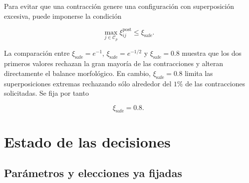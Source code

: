\documentclass[11pt,a4paper]{article}
\begin{document}
Para evitar que una contracción genere una configuración con
superposición excesiva, puede imponerse la condición

\begin{equation}
	\max_{j\in\mathcal C_p}
	\xi_{ij}^{\mathrm{post}}
	\leq
	\xi_{\mathrm{safe}}.
\end{equation}

La comparación entre
$\xi_{\mathrm{safe}}=e^{-1}$,
$\xi_{\mathrm{safe}}=e^{-1/2}$ y
$\xi_{\mathrm{safe}}=0.8$
muestra que los dos primeros valores rechazan la gran mayoría de las
contracciones y alteran directamente el balance morfológico. En cambio,
$\xi_{\mathrm{safe}}=0.8$ limita las superposiciones extremas rechazando
sólo alrededor del $1\%$ de las contracciones solicitadas. Se fija por tanto

\begin{equation}
	\boxed{\xi_{\mathrm{safe}}=0.8}.
\end{equation}

\section{Estado de las decisiones}

\subsection{Parámetros y elecciones ya fijadas}
\end{document}
